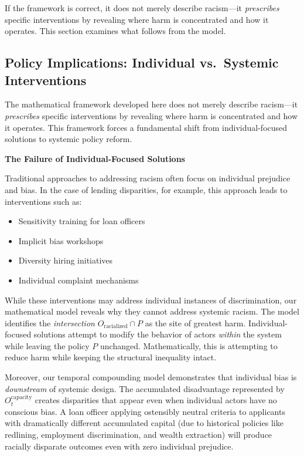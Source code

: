 \documentclass[12pt]{article}
\begin{document}
If the framework is correct, it does not merely describe racism---it \textit{prescribes} specific interventions by revealing where harm is concentrated and how it operates. This section examines what follows from the model.

\subsection{Policy Implications: Individual vs.\ Systemic Interventions}

The mathematical framework developed here does not merely describe racism---it \textit{prescribes} specific interventions by revealing where harm is concentrated and how it operates. This framework forces a fundamental shift from individual-focused solutions to systemic policy reform.

\textbf{The Failure of Individual-Focused Solutions}

Traditional approaches to addressing racism often focus on individual prejudice and bias. In the case of lending disparities, for example, this approach leads to interventions such as:
\begin{itemize}
    \item Sensitivity training for loan officers
    \item Implicit bias workshops
    \item Diversity hiring initiatives
    \item Individual complaint mechanisms
\end{itemize}

While these interventions may address individual instances of discrimination, our mathematical model reveals why they cannot address systemic racism. The model identifies the \textit{intersection} $O_{\text{racialized}} \cap P$ as the site of greatest harm. Individual-focused solutions attempt to modify the behavior of actors \textit{within} the system while leaving the policy $P$ unchanged. Mathematically, this is attempting to reduce harm while keeping the structural inequality intact.

Moreover, our temporal compounding model demonstrates that individual bias is \textit{downstream} of systemic design. The accumulated disadvantage represented by $O_t^{\text{capacity}}$ creates disparities that appear even when individual actors have no conscious bias. A loan officer applying ostensibly neutral criteria to applicants with dramatically different accumulated capital (due to historical policies like redlining, employment discrimination, and wealth extraction) will produce racially disparate outcomes even with zero individual prejudice.
\end{document}
